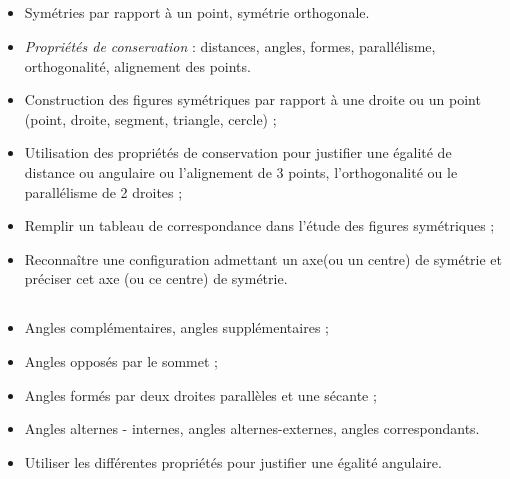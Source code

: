 \subsection*{}

\savoir
\begin{itemize}
\item Symétries par rapport à un point, symétrie orthogonale.
\item \textit{Propriétés de conservation} : distances, angles, formes, parallélisme, orthogonalité, alignement des points.
\end{itemize}
\savoirfaire
\begin{itemize}
\item Construction des figures symétriques par rapport à une droite ou un point (point, droite, segment, triangle, cercle) ;
\item Utilisation des propriétés de conservation pour justifier une égalité de distance ou angulaire ou l'alignement de 3 points, l'orthogonalité ou le parallélisme de 2 droites ;
\item Remplir un tableau de correspondance dans l'étude des figures symétriques ;
\item Reconnaître une configuration admettant un axe(ou un centre) de symétrie et préciser cet axe (ou ce centre) de symétrie.
\end{itemize}

\subsection*{}

\savoir
\begin{itemize}
\item Angles complémentaires, angles supplémentaires ;
\item Angles opposés par le sommet ;
\item Angles formés par deux droites parallèles et une sécante ;
\item Angles alternes - internes, angles alternes-externes, angles correspondants.
\end{itemize}
\savoirfaire
\begin{itemize}
\item Utiliser les différentes propriétés pour justifier une égalité angulaire.
\end{itemize}

